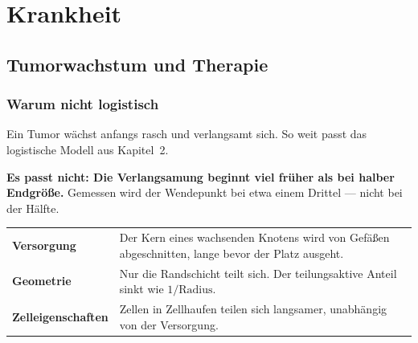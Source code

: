 \part{Krankheit}

\chapter{Tumorwachstum und Therapie}

\section{Warum nicht logistisch}

\begin{merksatz}
Ein Tumor wächst anfangs rasch und verlangsamt sich. So weit passt das logistische Modell aus Kapitel~2.

\begin{center}
\begin{minipage}{0.9\textwidth}
\textbf{Es passt nicht: Die Verlangsamung beginnt viel früher als bei halber Endgröße.} Gemessen wird der Wendepunkt bei etwa einem Drittel --- nicht bei der Hälfte.
\end{minipage}
\end{center}

\begin{center}
{\small
\renewcommand{\arraystretch}{1.5}
\begin{tabular}{@{}P{3.0cm}P{5.6cm}@{}}
\toprule
\textbf{Versorgung} & Der Kern eines wachsenden Knotens wird von Gefäßen abgeschnitten, lange bevor der Platz ausgeht.\\
\textbf{Geometrie} & Nur die Randschicht teilt sich. Der teilungsaktive Anteil sinkt wie $1/\text{Radius}$.\\
\textbf{Zell\-eigenschaften} & Zellen in Zellhaufen teilen sich langsamer, unabhängig von der Versorgung.\\
\bottomrule
\end{tabular}}
\end{center}

\begin{center}
\begin{minipage}{0.88\textwidth}
\end{minipage}
\end{center}
\end{merksatz}

